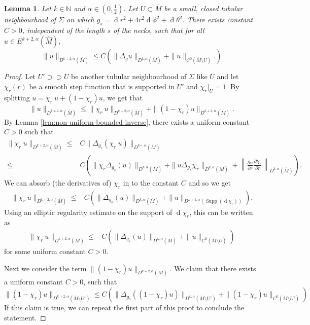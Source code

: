 \documentclass[preprint,12pt]{elsarticle}
\numberwithin{table}{section}
\newtheorem{lemma}{Lemma}[section]
\newcommand{\N}{\mathbb{N}}
\newcommand{\del}{\partial}
\renewcommand{\d}{\operatorname{d}\!}
\begin{document}
\begin{lemma} 
	\label{lem:Schauder-estimate-Holder}
	Let $k \in \N$ and $\alpha \in (0,\frac{1}{2})$.
	Let $U \subset \overline{M}$ be a small, closed tubular neighbourhood of $\Sigma$ on which $g_s = \d r^2 + 4 r^2 \d \phi^2 + \d \theta^2$.
	There exists constant $C > 0$, independent of the length $s$ of the necks, such that for all $u \in E^{k+2, \alpha}(\hat{M})$,
	$$
	\|u\|_{D^{k+2, \alpha}(\overline{M})} \le C \left(
		\|\Delta_g u\|_{D^{k, \alpha}(\overline{M})}
		+ \|u\|_{C^{0}(\overline{M} \setminus U)}.
	\right)
	$$
\end{lemma}
\begin{proof}
	Let $U' \supset\supset U$ be another tubular neighbourhood of $\Sigma$ like $U$ and let
	$\chi_r(r)$ be a smooth step function that is supported in $U'$ and $\chi_r|_U = 1$.
	By splitting $u = \chi_r \: u + (1-\chi_r) u$, we get that
	$$
	\|u\|_{D^{k+2, \alpha}(\overline{M})} \le \|\chi_r \:u\|_{D^{k+2, \alpha}(\overline{M})} + \|(1-\chi_r)u\|_{D^{k+2, \alpha}(\overline{M})}.
	$$
	By Lemma \ref{lem:non-uniform-bounded-inverse}, there exists a uniform constant $C > 0$ such that
	\begin{align}
		\|\chi_r \:u\|_{D^{k+2, \alpha}(\overline{M})} \le& C \|\Delta_{g_s}(\chi_r \:u)\|_{D^{k+, \alpha}(\overline{M})}  \\
		\le& C 
		\left(
			\|\chi_r \Delta_{g_s}(u)\|_{D^{k, \alpha}(\overline{M})}	
		 	+ \| u \Delta_{g_s}\chi_r\|_{D^{k, \alpha}(\overline{M})}
			+ \left\|\frac{\del u}{\del r} \frac{\del \chi_r}{\del r}\right\|_{D^{k, \alpha}(\overline{M})}
		\right).
	\end{align}
	We can absorb (the derivatives of) $\chi_r$ in to the constant $C$ and so we get
	\begin{align}
		\|\chi_r \:u\|_{D^{k+2, \alpha}(\overline{M})}
		\le& C 
		\left(
			\|\Delta_{g_s}(u)\|_{D^{k, \alpha}(\overline{M})}
			+ \| u \|_{D^{k+1, \alpha}(\operatorname{Supp}(\d \chi_r ))}
		\right).
	\end{align}
	Using an elliptic regularity estimate on the support of $\d \chi_r$, this can be written as
	\begin{align}
		\|\chi_r \:u\|_{D^{k+2, \alpha}(\overline{M})}
		\le& C 
		\left(
			\|\Delta_{g_s}(u)\|_{D^{k, \alpha}(\overline{M})}
			+ \| u \|_{C^{0}(\overline{M} \setminus U)}
		\right)
	\end{align}
	for some uniform constant $ C > 0$.
	
	Next we consider the term $\|(1-\chi_r)u\|_{D^{k+2, \alpha}(\overline{M})}$. We claim that there exists a uniform constant $C > 0$, such that 
	$$
	\|(1-\chi_r)u\|_{D^{k+2, \alpha}(\overline{M}\setminus U')} \le
	C \left(
			\|\Delta_{g_s}((1-\chi_r)u)\|_{D^{k, \alpha}(\overline{M}\setminus U')}
			+ \|(1-\chi_r) u \|_{C^{0}(\overline{M} \setminus U')}
		\right)
	$$
	If this claim is true, we can repeat the first part of this proof to conclude the statement.


\end{proof}
\end{document}
